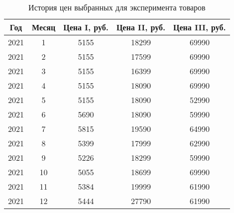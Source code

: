 \documentclass[a4paper]{bmstu}
\begin{document}
\begin{table}[H]
	\caption{История цен выбранных для эксперимента товаров}
	\begin{center}
		\begin{tabular}{| c | c | c | c | c |}
			\hline
			
			\textbf{Год} & \textbf{Месяц} & \textbf{Цена I, руб.} & \textbf{Цена II, руб.} & \textbf{Цена III, руб.} \\  
			
			\hline
			
			2021 & 1 & 5155 & 18299 & 69990 \\
			
			\hline
			
			2021 & 2 & 5155 & 17599 & 69990  \\
			
			\hline
			
			2021 & 3 & 5155 & 16399 & 69990  \\
			
			\hline
			
			2021 & 4 & 5155 & 18090 & 69990  \\
			
			\hline
			
			2021 & 5 & 5155 & 18090 & 52990  \\
			
			\hline
			
			2021 & 6 & 5690 & 18090 & 59990  \\
			
			\hline
			
			2021 & 7 & 5815 & 19590 & 64990  \\
			
			\hline
			
			2021 & 8 & 5399 & 17999 & 62990  \\
			
			\hline
			
			2021 & 9 & 5226 & 18299 & 59990  \\
			
			\hline
			
			2021 & 10 & 5055 & 18699 & 69990  \\
			
			\hline
			
			2021 & 11 & 5384 & 19999 &  61990  \\
			
			\hline
			
			2021 & 12 & 5444 & 27790 & 61990  \\
			

\end{tabular}
\end{center}
\end{table}
\end{document}
